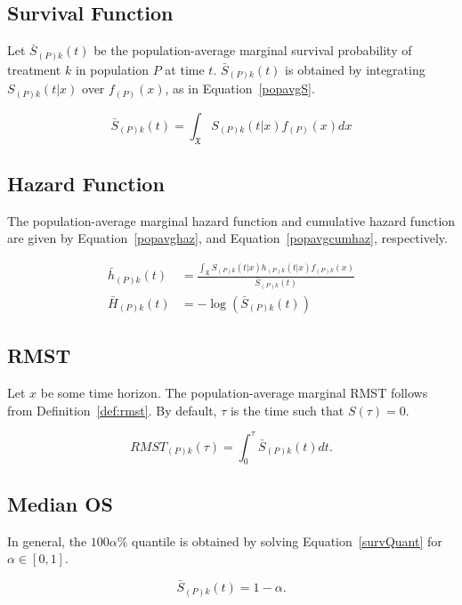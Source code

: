 \subsection{Survival Function}
Let $\bar{S}_{(P)k}(t)$ be the population-average marginal survival probability of treatment $k$ in population $P$ at time $t$. $\bar{S}_{(P)k}(t)$ is obtained by integrating $S_{(P)k}(t|x)$ over $f_{(P)}(x)$, as in Equation~\ref{popavgS}.

\begin{equation}
    \bar{S}_{(P)k}(t) = \int_{\mathfrak{X}}S_{(P)k}(t|x)f_{(P)}(x)dx
    \label{popavgS}
\end{equation}

\subsection{Hazard Function}
The population-average marginal hazard function and cumulative hazard function are given by Equation~\ref{popavghaz}, and Equation~\ref{popavgcumhaz}, respectively.

\begin{align}
    \bar{h}_{(P)k}(t) &= \frac{\int_{\mathfrak{X}}S_{(P)k}(t|x)h_{(P)k}(t|x)f_{(P)k}(x)}{\bar{S}_{(P)k}(t)} \label{popavghaz}\\
    \bar{H}_{(P)k}(t) &= -\log(\bar{S}_{(P)k}(t)) \label{popavgcumhaz}
\end{align}

\subsection{RMST}
Let $x$ be some time horizon. The population-average marginal RMST follows from Definition~\ref{def:rmst}. By default, $\tau$ is the time such that $S(\tau) = 0$.

\begin{equation}
    RMST_{(P)k}(\tau) = \int^{\tau}_{0} \bar{S}_{(P)k}(t)dt.
\end{equation}

\subsection{Median OS}
In general, the $100\alpha\%$ quantile is obtained by solving Equation~\ref{survQuant} for $\alpha \in [0, 1]$.

\begin{equation}
    \bar{S}_{(P)k}(t) = 1 - \alpha.
    \label{survQuant}
\end{equation}

